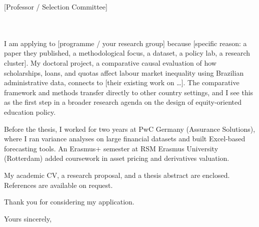 \documentclass[a4paper,11pt]{letter}
\begin{document}
\begin{letter}{%
    [Professor / Selection Committee] \\
    [Department of Economics] \\
    [University] \\
    [Address]
}

I am applying to [programme / your research group] because [specific reason: a paper they published, a methodological focus, a dataset, a policy lab, a research cluster]. My doctoral project, a comparative causal evaluation of how scholarships, loans, and quotas affect labour market inequality using Brazilian administrative data, connects to [their existing work on \ldots]. The comparative framework and methods transfer directly to other country settings, and I see this as the first step in a broader research agenda on the design of equity-oriented education policy.


Before the thesis, I worked for two years at PwC Germany (Assurance Solutions), where I ran variance analyses on large financial datasets and built Excel-based forecasting tools. An Erasmus+ semester at RSM Erasmus University (Rotterdam) added coursework in asset pricing and derivatives valuation.


My academic CV, a research proposal, and a thesis abstract are enclosed. References are available on request.

Thank you for considering my application.

\closing{Yours sincerely,}

\end{letter}
\end{document}
